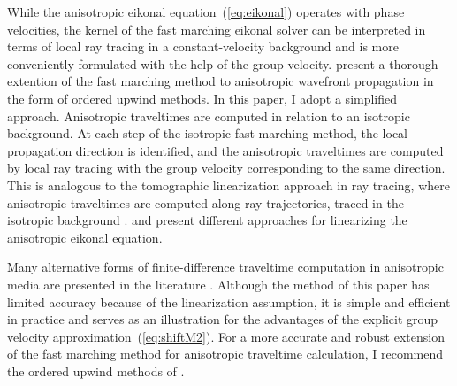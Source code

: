 While the anisotropic eikonal equation~(\ref{eq:eikonal}) operates with phase
velocities, the kernel of the fast marching eikonal solver can be interpreted
in terms of local ray tracing in a constant-velocity background
\cite[]{Fomel.sep.95.sergey3} and is more conveniently formulated with the help
of the group velocity. \cite{alex} present a thorough extention of the
fast marching method to anisotropic wavefront propagation in the form of
ordered upwind methods. In this paper, I adopt a simplified approach.
Anisotropic traveltimes are computed in relation to an isotropic background.
At each step of the isotropic fast marching method, the local propagation
direction is identified, and the anisotropic traveltimes are computed by local
ray tracing with the group velocity corresponding to the same direction.  This
is analogous to the tomographic linearization approach in ray tracing, where
anisotropic traveltimes are computed along ray trajectories, traced in the
isotropic background \cite[]{pratt}. \cite{tariq} and \cite{schneider}
present different approaches for linearizing the anisotropic eikonal equation.

Many alternative forms of finite-difference traveltime computation in
anisotropic media are presented in the literature
\cite[]{GEO58-09-13491358,SEG-1997-1786,SEG-1999-18751878,ANI00-00-03330338,SEG-2001-12251228,qin,linbin}.
Although the method of this paper has limited accuracy because of the
linearization assumption, it is simple and efficient in practice and serves as
an illustration for the advantages of the explicit group velocity
approximation~(\ref{eq:shiftM2}).  For a more accurate and robust extension of
the fast marching method for anisotropic traveltime calculation, I recommend
the ordered upwind methods of \cite{alex,alex2}.

